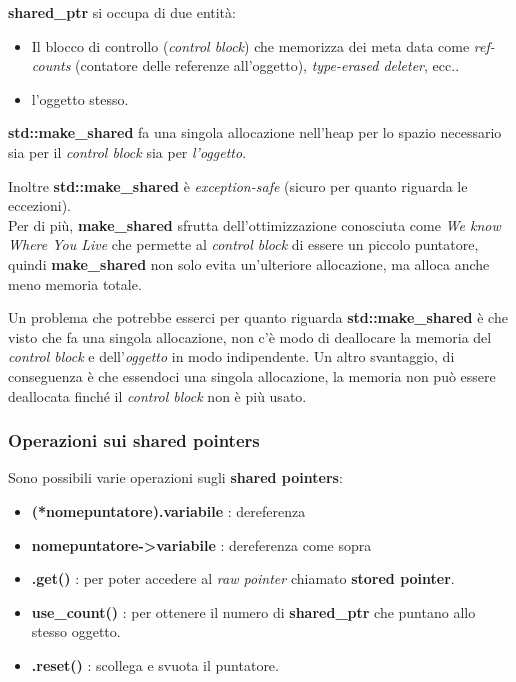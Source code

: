 \textsf{\small \textbf{shared\_ptr} si occupa di due entità: } \\

\begin{itemize}
	\item \textsf{\small Il blocco di controllo (\emph{control block}) che memorizza dei meta data come \emph{ref-counts} (contatore delle referenze all'oggetto), \emph{type-erased deleter}, ecc..}
	\item \textsf{\small l'oggetto stesso.}
\end{itemize}

\textsf{\small \textbf{std::make\_shared} fa una singola allocazione nell'heap per lo spazio necessario sia per il \emph{control block} sia per \emph{l'oggetto}. } \break

\textsf{\small Inoltre \textbf{std::make\_shared} è \emph{exception-safe} (sicuro per quanto riguarda le eccezioni).} \\

\textsf{\small Per di più, \textbf{make\_shared} sfrutta dell'ottimizzazione conosciuta come \emph{We know Where You Live} che permette al \emph{control block} di essere un piccolo puntatore, quindi \textbf{make\_shared} non solo evita un'ulteriore allocazione, ma alloca anche meno memoria totale.} \break

\textsf{\small Un problema che potrebbe esserci per quanto riguarda \textbf{std::make\_shared} è che visto che fa una singola allocazione, non c'è modo di deallocare la memoria del \emph{control block} e dell'\emph{oggetto} in modo indipendente. Un altro svantaggio, di conseguenza è che essendoci una singola allocazione, la memoria non può essere deallocata finché il \emph{control block} non è più usato. } \\

\subsubsection{Operazioni sui shared pointers}

\textsf{\small Sono possibili varie operazioni sugli \textbf{shared pointers}: } \\

\begin{itemize}
	\item \textsf{\small \textbf{(*nomepuntatore).variabile} : dereferenza}
	\item \textsf{\small \textbf{nomepuntatore->variabile} : dereferenza come sopra}
	\item \textsf{\small \textbf{.get()} : per poter accedere al \emph{raw pointer} chiamato \textbf{stored pointer}.}
	\item \textsf{\small \textbf{use\_count()} : per ottenere il numero di \textbf{shared\_ptr} che puntano allo stesso oggetto.}
	\item \textsf{\small \textbf{.reset()} : scollega e svuota il puntatore.}
\end{itemize}

